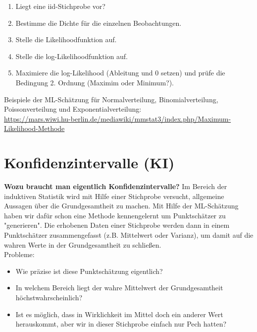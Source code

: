 \documentclass[a4paper]{article}
\newcommand\dangersign[1][2ex]{%
  \renewcommand\stacktype{L}%
  \scaleto{\stackon[1.3pt]{\color{red}$\triangle$}{\tiny !}}{#1}%
}
\begin{document}
\begin{enumerate}
    \item Liegt eine iid-Stichprobe vor?
    \item Bestimme die Dichte für die einzelnen Beobachtungen.
    \item Stelle die Likelihoodfunktion auf.
    \item Stelle die log-Likelihoodfunktion auf.
    \item Maximiere die log-Likelihood (Ableitung und 0 setzen) und prüfe die Bedingung 2. Ordnung (Maximim oder Minimum?).
\end{enumerate}

\noindent Beispiele der ML-Schätzung für Normalverteilung, Binomialverteilung, Poissonverteilung und Exponentialverteilung:\\
\url{https://mars.wiwi.hu-berlin.de/mediawiki/mmstat3/index.php/Maximum-Likelihood-Methode}




\newpage




\section{Konfidenzintervalle (KI)}\label{sec:KI}

\textbf{Wozu braucht man eigentlich Konfidenzintervalle?} Im Bereich der induktiven Statistik wird mit Hilfe einer Stichprobe versucht, allgemeine Aussagen über die Grundgesamtheit zu machen. Mit Hilfe der ML-Schätzung haben wir dafür schon eine Methode kennengelernt um Punktschätzer zu "generieren". Die erhobenen Daten einer Stichprobe werden dann in einem Punktschätzer zusammengefasst (z.B. Mittelwert oder Varianz), um damit auf die wahren Werte in der Grundgesamtheit zu schließen.\\

\noindent \dangersign[3ex] Probleme:

\begin{itemize}
    \item Wie präzise ist diese Punktschätzung eigentlich?
    \item In welchem Bereich liegt der wahre Mittelwert der Grundgesamtheit höchstwahrscheinlich?
    \item Ist es möglich, dass in Wirklichkeit im Mittel doch ein anderer Wert herauskommt, aber wir in dieser Stichprobe einfach nur Pech hatten?
\end{itemize}
\end{document}
